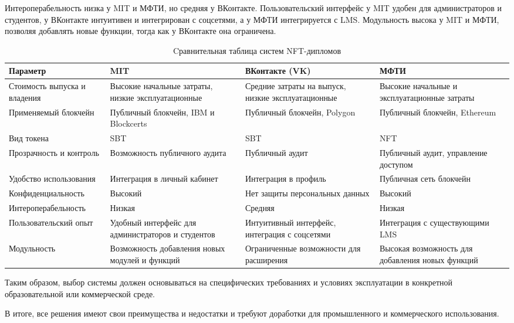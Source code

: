 Интероперабельность низка у MIT и МФТИ, но средняя у ВКонтакте. Пользовательский интерфейс у MIT удобен для администраторов и студентов, у ВКонтакте интуитивен и интегрирован с соцсетями, а у МФТИ интегрируется с LMS. Модульность высока у MIT и МФТИ, позволяя добавлять новые функции, тогда как у ВКонтакте она ограничена.

\begin{table}[H]
    \caption{Cравнительная таблица систем NFT-дипломов}
    \centering

    \emergencystretch=10pt
    \begin{tabular}{|x{4cm}|x{3.2cm}|x{3.2cm}|x{3.2cm}|}
        \hline
        \textbf{Параметр} & \textbf{MIT} & \textbf{ВКонтакте (VK)} & \textbf{МФТИ} \\ \hline
        Стоимость выпуска и владения & Высокие начальные затраты, низкие эксплуатационные & Средние затраты на выпуск, низкие эксплуатационные & Высокие начальные и эксплуатационные затраты \\ \hline
        Применяемый блокчейн & Публичный блокчейн, IBM и Blockcerts & Публичный блокчейн, Polygon & Публичный блокчейн, Ethereum \\ \hline
        Вид токена & SBT & SBT & NFT \\ \hline
        Прозрачность и контроль & Возможность публичного аудита & Публичный аудит & Публичный аудит, управление доступом \\ \hline
        Удобство использования & Интеграция в личный кабинет & Интеграция в профиль & Публичная сеть блокчейн \\ \hline
        Конфиденциальность & Высокий & Нет защиты персональных данных & Высокий \\ \hline
        Интероперабельность & Низкая & Средняя & Низкая \\ \hline
        Пользовательский опыт & Удобный интерфейс для администраторов и студентов & Интуитивный интерфейс, интеграция с соцсетями & Интеграция с существующими LMS \\ \hline
        Модульность & Возможность добавления новых модулей и функций & Ограниченные возможности для расширения & Высокая возможность для добавления новых функций \\ \hline
    \end{tabular}
    \label{tab:nft_diplomas_comparison}
\end{table}

Таким образом, выбор системы должен основываться на специфических требованиях и условиях эксплуатации в конкретной образовательной или коммерческой среде.

В итоге, все решения имеют свои преимущества и недостатки и требуют доработки для промышленного и коммерческого использования.
